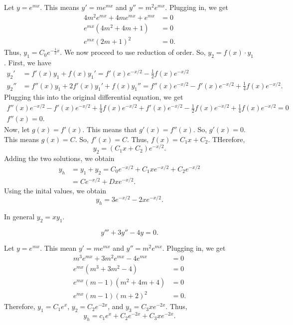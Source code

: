 \begin{soln}
    Let $y=e^{mx}$. This means $y' = me^{mx}$ and $y''=m^2e^{mx}$. Plugging in,
    we get
    \begin{align*}
        4m^2e^{mx} + 4me^{mx} + e^{mx} &= 0 \\
        e^{mx}(4m^2+4m+1) &=0 \\
        e^{mx}(2m+1)^2 &=0.
    \end{align*}
    Thus, $\boxed{y_1 = C_0e^{-\frac{1}{2}x}}$. We now proceed to use reduction
    of order. So, $y_2 = f(x) \cdot y_1$. First, we have
    \begin{align*}
    y_2' &= f'(x)y_1+f(x)y_1' = f'(x)e^{-x/2}-\frac{1}{2}f(x)e^{-x/2}\\
    y_2'' &= f''(x)y_1+2f'(x)y_1'+f(x)y_1'' = f''(x)e^{-x/2}-f'(x)e^{-x/2}+\frac{1}{4}f(x)e^{-x/2}.
    \end{align*}
    Plugging this into the original differential equation, we get
    \begin{align*}
        f''(x)e^{-x/2}-f'(x)e^{-x/2}+\frac{1}{4}f(x)e^{-x/2} + 
        f'(x)e^{-x/2}-\frac{1}{2}f(x)e^{-x/2} +\frac{1}{4}f(x)e^{-x/2}= 0 \\
        f''(x) = 0.
    \end{align*}
    Now, let $g(x) = f'(x)$. This means that $g'(x) = f''(x)$. So, $g'(x) =0$.
    This means $g(x) = C$. So, $f'(x) =C$. Thus, $f(x) = C_1x+C_2$. THerefore,
    $$y_2 = (C_1x+C_2)e^{-x/2}.$$
    Adding the two solutions, we obtain 
    \begin{align*}
        y_h &= y_1 + y_2 = C_0e^{-x/2} + C_1xe^{-x/2} + C_2e^{-x/2} \\
            &= Ce^{-x/2}+Dxe^{-x/2}.
    \end{align*}
    Using the inital values, we obtain
    $$y_h = 3e^{-x/2}-2xe^{-x/2}.$$
\end{soln}
In general $y_2 = xy_1$.

\begin{example}
    $$y'''+3y''-4y = 0.$$
\end{example}
\begin{soln}
    Let $y=e^{mx}$. This mean $y' = me^{mx}$ and $y'' = m^2e^{mx}$. Plugging
    in, we get 
    \begin{align*}
        m^3e^{mx} + 3m^2e^{mx} -4e^{mx} &= 0 \\
        e^{mx}\left(m^3+3m^2-4\right) &= 0\\
        e^{mx}(m-1)(m^2+4m+4) &= 0\\
        e^{mx}(m-1)(m+2)^2 &= 0.
    \end{align*}
    Therefore, $y_1 = C_1e^x$, $y_2 = C_2e^{-2x}$, and $y_3 = C_3xe^{-2x}$.
    Thus, $$\boxed{y_h = c_1e^{x} + C_2e^{-2x} + C_3xe^{-2x}}.$$
\end{soln}

